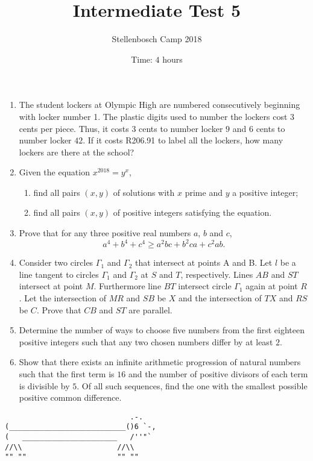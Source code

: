 \documentclass{article}
\title{Intermediate Test 5}
\author{Stellenbosch Camp 2018}
\date{Time: $4$ hours}
\begin{document}
 \maketitle

\begin{enumerate}[1.]

\item %
The student lockers at Olympic High are numbered consecutively beginning with locker number 1. The plastic digits used to number the lockers cost $3$ cents per piece. Thus, it costs $3$ cents to number locker $9$ and $6$ cents to number locker $42$. If it costs R206.91 to label all the lockers, how many lockers are there at the school?


\vspace{6pt}
\item %
Given the equation $x^{2018} = y^x$,
\begin{enumerate}
  \item find all pairs $(x,y)$ of solutions with $x$ prime and $y$ a positive integer;
  \item find all pairs $(x,y)$ of positive integers satisfying the equation.
\end{enumerate}


\vspace{6pt}
\item %
Prove that for any three positive real numbers $a$, $b$ and $c$, \[ a^4 +b^4 +c^4 \geq a^2bc +b^2ca +c^2ab. \]


\item %
Consider two circles $\Gamma_1$ and $\Gamma_2$ that intersect at points A and B. Let $l$ be a line tangent to circles $\Gamma_1$ and $\Gamma_2$ at $S$ and $T$, respectively. Lines $AB$ and $ST$ intersect at point $M$. Furthermore line $BT$ intersect circle $\Gamma_1$ again at point $R$. Let the intersection of $MR$ and $SB$ be $X$ and the intersection of $TX$ and $RS$ be $C$. 
Prove that $CB$ and $ST$ are parallel.  


\vspace{6pt}
\item %
Determine the number of ways to choose five numbers from the first eighteen positive integers such that any two chosen numbers differ by at least $2$.


\vspace{6pt}
\item %
Show that there exists an infinite arithmetic progression of natural numbers such that the first term is $16$ and the number of positive divisors of each term is divisible by $5$. Of all such sequences, find the one with the smallest possible positive common difference.


\end{enumerate}


\vfill
\centering
\begin{BVerbatim}
                             .-.
(___________________________()6 `-,
(   ______________________   /''"`
//\\                      //\\
"" ""                     "" ""
\end{BVerbatim}
\end{document}
